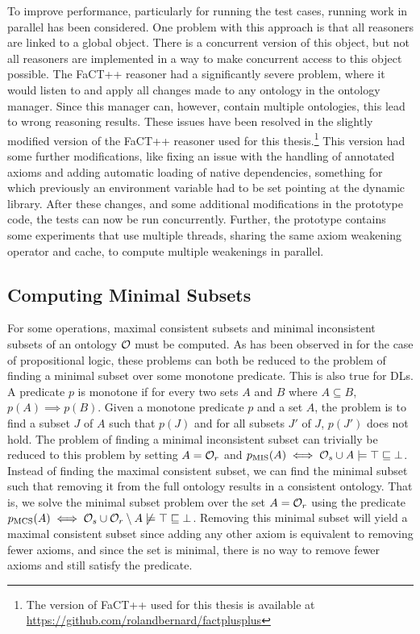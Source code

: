 To improve performance, particularly for running the test cases, running work in parallel has been considered. One problem with this approach is that all reasoners are linked to a global  object. There is a concurrent version of this object, but not all reasoners are implemented in a way to make concurrent access to this object possible. The FaCT++ reasoner \cite{factpp} had a significantly severe problem, where it would listen to and apply all changes made to any ontology in the ontology manager. Since this manager can, however, contain multiple ontologies, this lead to wrong reasoning results. These issues have been resolved in the slightly modified version of the FaCT++ reasoner used for this thesis.\footnote{The version of FaCT++ used for this thesis is available at \url{https://github.com/rolandbernard/factplusplus}} This version had some further modifications, like fixing an issue with the handling of annotated axioms and adding automatic loading of native dependencies, something for which previously an environment variable had to be set pointing at the dynamic library. After these changes, and some additional modifications in the prototype code, the tests can now be run concurrently. Further, the prototype contains some experiments that use multiple threads, sharing the same axiom weakening operator and cache, to compute multiple weakenings in parallel.

\subsection{Computing Minimal Subsets}\label{minimal-set-impl}

For some operations, maximal consistent subsets and minimal inconsistent subsets of an ontology $\mathcal{O}$ must be computed. As has been observed in \cite{marques2013minimal} for the case of propositional logic, these problems can both be reduced to the problem of finding a minimal subset over some monotone predicate. This is also true for DLs. A predicate $p$ is monotone if for every two sets $A$ and $B$ where $A \subseteq B$, $p(A) \implies p(B)$. Given a monotone predicate $p$ and a set $A$, the problem is to find a subset $J$ of $A$ such that $p(J)$ and for all subsets $J'$ of $J$, $p(J')$ does not hold. The problem of finding a minimal inconsistent subset can trivially be reduced to this problem by setting $A = \mathcal{O}_r$ and $p_\textnormal{MIS}(A) \iff \mathcal{O}_s \cup A \models \top \sqsubseteq \bot$. Instead of finding the maximal consistent subset, we can find the minimal subset such that removing it from the full ontology results in a consistent ontology. That is, we solve the minimal subset problem over the set $A = \mathcal{O}_r$ using the predicate $p_\textnormal{MCS}(A) \iff \mathcal{O}_s \cup \mathcal{O}_r \setminus A \not\models \top \sqsubseteq \bot$. Removing this minimal subset will yield a maximal consistent subset since adding any other axiom is equivalent to removing fewer axioms, and since the set is minimal, there is no way to remove fewer axioms and still satisfy the predicate.

